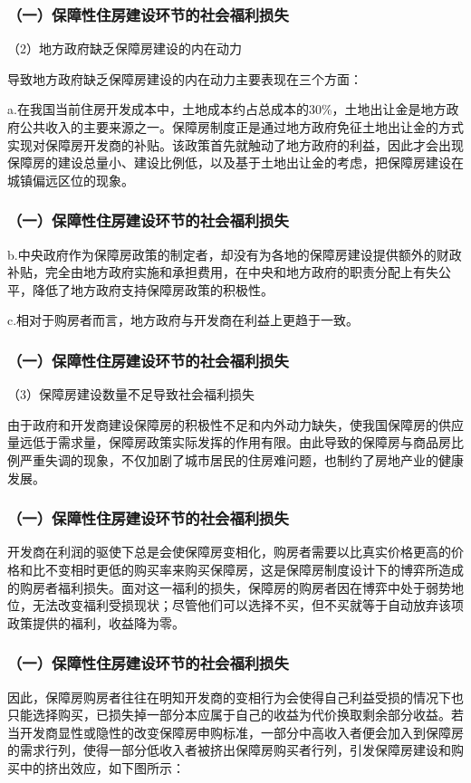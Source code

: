 \documentclass[aspectratio=169, 12pt]{beamer}
\begin{document}
\begin{frame}[plain]
    \frametitle{（一）保障性住房建设环节的社会福利损失}
    （2）地方政府缺乏保障房建设的内在动力\par
         导致地方政府缺乏保障房建设的内在动力主要表现在三个方面：\par
         a.在我国当前住房开发成本中，土地成本约占总成本的30\%，土地出让金是地方政府公共收入的主要来源之一。保障房制度正是通过地方政府免征土地出让金的方式实现对保障房开发商的补贴。该政策首先就触动了地方政府的利益，因此才会出现保障房的建设总量小、建设比例低，以及基于土地出让金的考虑，把保障房建设在城镇偏远区位的现象。
\end{frame}

\begin{frame}[plain]
    \frametitle{（一）保障性住房建设环节的社会福利损失}
    b.中央政府作为保障房政策的制定者，却没有为各地的保障房建设提供额外的财政补贴，完全由地方政府实施和承担费用，在中央和地方政府的职责分配上有失公平，降低了地方政府支持保障房政策的积极性。
    \par
    c.相对于购房者而言，地方政府与开发商在利益上更趋于一致。
\end{frame}

\begin{frame}[plain]
    \frametitle{（一）保障性住房建设环节的社会福利损失}
    （3）保障房建设数量不足导致社会福利损失\par
       由于政府和开发商建设保障房的积极性不足和内外动力缺失，使我国保障房的供应量远低于需求量，保障房政策实际发挥的作用有限。由此导致的保障房与商品房比例严重失调的现象，不仅加剧了城市居民的住房难问题，也制约了房地产业的健康发展。
\end{frame}

\begin{frame}[plain]
    \frametitle{（一）保障性住房建设环节的社会福利损失}
    开发商在利润的驱使下总是会使保障房变相化，购房者需要以比真实价格更高的价格和比不变相时更低的购买率来购买保障房，这是保障房制度设计下的博弈所造成的购房者福利损失。面对这一福利的损失，保障房的购房者因在博弈中处于弱势地位，无法改变福利受损现状；尽管他们可以选择不买，但不买就等于自动放弃该项政策提供的福利，收益降为零。
\end{frame}

\begin{frame}[plain]
    \frametitle{（一）保障性住房建设环节的社会福利损失}
    因此，保障房购房者往往在明知开发商的变相行为会使得自己利益受损的情况下也只能选择购买，已损失掉一部分本应属于自己的收益为代价换取剩余部分收益。若当开发商显性或隐性的改变保障房申购标准，一部分中高收入者便会加入到保障房的需求行列，使得一部分低收入者被挤出保障房购买者行列，引发保障房建设和购买中的挤出效应，如下图所示：
\end{frame}
\end{document}

